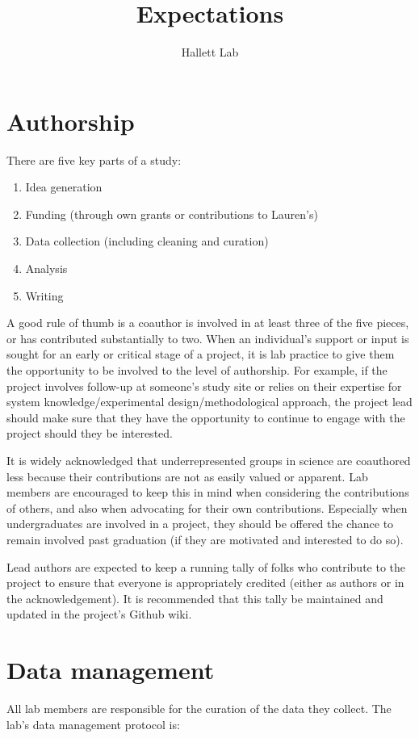 \documentclass[12pt]{article}
\title{Expectations}
\author{Hallett Lab}
\begin{document}
\maketitle

\section{Authorship}
There are five key parts of a study:
\begin{enumerate}
\item Idea generation
\item Funding (through own grants or contributions to Lauren's)
\item Data collection (including cleaning and curation)
\item Analysis
\item Writing
\end{enumerate}

A good rule of thumb is a coauthor is involved in at least three
of the five pieces, or has contributed substantially to two. When an individual's support or input is sought for an early or critical stage of a project, it is lab practice to give them the opportunity to be involved to the level of authorship. For example, if the project involves follow-up at someone's study site or relies on their expertise for system knowledge/experimental design/methodological approach, the project lead should make sure that they have the opportunity to continue to engage with the project should they be interested. 

It is widely acknowledged that underrepresented
groups in science are coauthored less because their contributions are
not as easily valued or apparent. Lab members are encouraged to keep
this in mind when considering the contributions of others, and also
when advocating for their own contributions. Especially when undergraduates are involved in a project, they should be offered the chance to remain involved past graduation (if they are motivated and interested to do so). 

Lead authors are expected to keep a running tally of folks who contribute to the project to ensure that everyone is appropriately credited (either as authors or in the acknowledgement). It is recommended that this tally be maintained and updated in the project's Github wiki.

\section{Data management}
All lab members are responsible for the curation of the data they
collect. The lab's data management protocol is:
\end{document}
